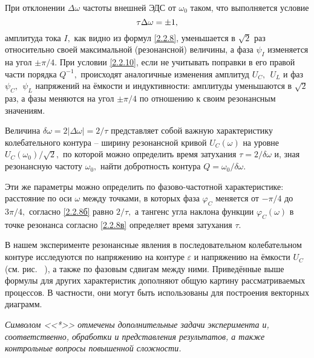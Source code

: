 При отклонении $\Delta\omega$ частоты внешней ЭДС от $\omega_0$ таком, что выполняется условие
\begin{equation}\eqmark{2.2.10}
\tau\Delta\omega=\pm1,
\end{equation}
амплитуда тока $I,$ как видно из формул \eqref{2.2.8}, уменьшается в $\sqrt{2}$ раз относительно своей максимальной (резонансной) величины, а фаза $\psi_I$ изменяется на угол $\pm\pi/4.$ При условии \eqref{2.2.10}, если не учитывать поправки в его правой части порядка $Q^{-1},$ происходят аналогичные изменения амплитуд $U_C,~~U_L $ и фаз $\psi_C,~~\psi_L$ напряжений на ёмкости и индуктивности: амплитуды уменьшаются в $\sqrt{2}$ раз, а фазы меняются на угол $\pm\pi/4$ по отношению к своим резонансным значениям.

Величина $\delta\omega=2|\Delta\omega|=2/\tau$ представляет собой важную характеристику колебательного контура – ширину резонансной кривой $U_C(\omega)$ на уровне $U_C(\omega_0)/\sqrt{2},$ по которой можно определить время затухания $\tau=2/\delta\omega$ и, зная резонансную частоту $\omega_0,$ найти добротность контура $Q=\omega_0/\delta\omega.$

Эти же параметры можно определить по фазово-частотной характеристике: расстояние по оси $\omega$ между точками, в которых фаза $\varphi_C$ меняется от $-\pi/4$ до $3\pi/4,$ согласно \eqref{2.2.8б} равно $2/\tau,$ а тангенс угла наклона функции $\varphi_C(\omega)$ в точке резонанса согласно \eqref{2.2.8в} определяет время затухания $\tau.$

В нашем эксперименте резонансные явления в последовательном колебательном контуре исследуются по напряжению на контуре $\varepsilon$ и напряжению на ёмкости $U_C$ (см. рис. ~), а также по фазовым сдвигам между ними. Приведённые выше формулы для других характеристик дополняют общую картину рассматриваемых процессов. В частности, они могут быть использованы для построения векторных диаграмм.

\emph{Символом <<*>> отмечены дополнительные задачи эксперимента и, соответственно, обработки и представления результатов, а также контрольные вопросы повышенной сложности.}

